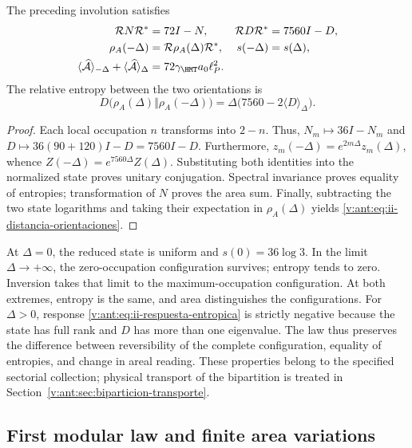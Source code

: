 \begin{theorem}
The preceding involution satisfies
\begin{align}
 \mathcal R N\mathcal R^*&=72I-N,&
 \mathcal R D\mathcal R^*&=7560I-D,\\
 \rho_A(-\Delta)&=\mathcal R\rho_A(\Delta)\mathcal R^*,&
 s(-\Delta)&=s(\Delta),
 \label{v:ant:eq:ii-inversion-entropia}\\
 \langle\widehat{\mathcal A}\rangle_{-\Delta}
 +\langle\widehat{\mathcal A}\rangle_\Delta
 &=72\gamma_{\HMT}a_0\ell_P^2.&&
 \label{v:ant:eq:ii-area-complementaria}
\end{align}
The relative entropy between the two orientations is
\begin{equation}
 D\bigl(\rho_A(\Delta)\Vert\rho_A(-\Delta)\bigr)
 =\Delta\bigl(7560-2\langle D\rangle_\Delta\bigr).
 \label{v:ant:eq:ii-distancia-orientaciones}
\end{equation}
\end{theorem}
\begin{proof}
Each local occupation $n$ transforms into $2-n$. Thus,
$N_m\mapsto36I-N_m$ and
$D\mapsto36(90+120)I-D=7560I-D$.
Furthermore, $z_m(-\Delta)=e^{2m\Delta}z_m(\Delta)$,
whence $Z(-\Delta)=e^{7560\Delta}Z(\Delta)$.
Substituting both identities into the normalized state proves
unitary conjugation. Spectral invariance proves equality
of entropies; transformation of $N$ proves the area sum.
Finally, subtracting the two state logarithms and taking
their expectation in $\rho_A(\Delta)$ yields
\eqref{v:ant:eq:ii-distancia-orientaciones}.
\end{proof}

At $\Delta=0$, the reduced state is uniform and
$s(0)=36\log3$. In the limit $\Delta\to+\infty$, the zero-occupation
configuration survives; entropy tends to zero.
Inversion takes that limit to the maximum-occupation configuration.
At both extremes, entropy is the same, and area distinguishes the
configurations. For $\Delta>0$, response
\eqref{v:ant:eq:ii-respuesta-entropica} is strictly negative because
the state has full rank and $D$ has more than one eigenvalue.
The law thus preserves the difference between reversibility of the
complete configuration, equality of entropies, and change in areal reading.
These properties belong to the specified sectorial collection;
physical transport of the bipartition is treated in
Section~\ref{v:ant:sec:biparticion-transporte}.

\subsection{First modular law and finite area variations}
\label{v:ant:sec:ii-area-ley-modular}

